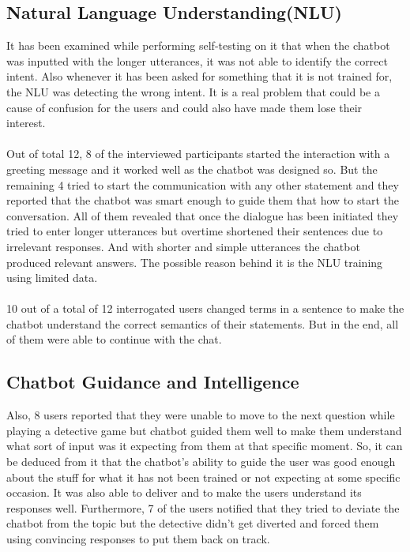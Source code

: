 \subsection{Natural Language Understanding(NLU)}
It has been examined while performing self-testing on it that when the chatbot was inputted with the longer utterances, it was not able to identify the correct intent. Also whenever it has been asked for something that it is not trained for, the NLU was detecting the wrong intent. It is a real problem that could be a cause of confusion for the users and could also have made them lose their interest.
\\~\\
Out of total 12, 8 of the interviewed participants started the interaction with a greeting message and it worked well as the chatbot was designed so. But the remaining 4 tried to start the communication with any other statement and they reported that the chatbot was smart enough to guide them that how to start the conversation. All of them revealed that once the dialogue has been initiated they tried to enter longer utterances but overtime shortened their sentences due to irrelevant responses. And with shorter and simple utterances the chatbot produced relevant answers. The possible reason behind it is the NLU training using limited data.
\\~\\
10 out of a total of 12 interrogated users changed terms in a sentence to make the chatbot understand the correct semantics of their statements. But in the end, all of them were able to continue with the chat.

\subsection{Chatbot Guidance and Intelligence}
Also, 8 users reported that they were unable to move to the next question while playing a detective game but chatbot guided them well to make them understand what sort of input was it expecting from them at that specific moment. So, it can be deduced from it that the chatbot's ability to guide the user was good enough about the stuff for what it has not been trained or not expecting at some specific occasion. It was also able to deliver and to make the users understand its responses well. Furthermore, 7 of the users notified that they tried to deviate the chatbot from the topic but the detective didn't get diverted and forced them using convincing responses to put them back on track.

